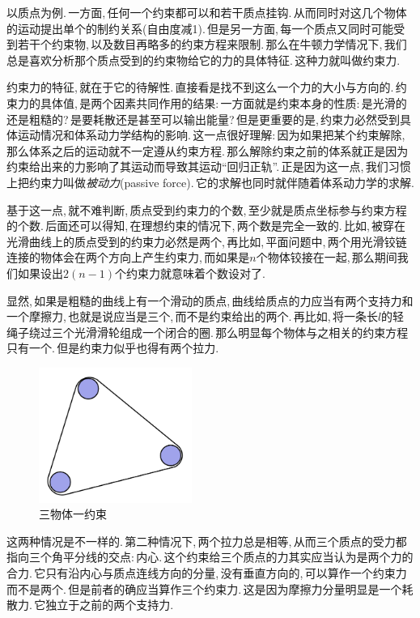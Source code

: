 以质点为例.\,一方面,\,任何一个约束都可以和若干质点挂钩.\,从而同时对这几个物体的运动提出单个的制约关系(自由度减1).\,但是另一方面,\,每一个质点又同时可能受到若干个约束物,\,以及数目再略多的约束方程来限制.\,那么在牛顿力学情况下,\,我们总是喜欢分析那个质点受到的约束物给它的力的具体特征.\,这种力就叫做约束力.

约束力的特征,\,就在于它的待解性.\,直接看是找不到这么一个力的大小与方向的.\,约束力的具体值,\,是两个因素共同作用的结果:\,一方面就是约束本身的性质:\,是光滑的还是粗糙的?\,是要耗散还是甚至可以输出能量?\,但是更重要的是,\,约束力必然受到具体运动情况和体系动力学结构的影响.\,这一点很好理解:\,因为如果把某个约束解除,\,那么体系之后的运动就不一定遵从约束方程.\,那么解除约束之前的体系就正是因为约束给出来的力影响了其运动而导致其运动``回归正轨''.\,正是因为这一点,\,我们习惯上把约束力叫做\emph{被动力}(passive force).\,它的求解也同时就伴随着体系动力学的求解.

基于这一点,\,就不难判断,\,质点受到约束力的个数,\,至少就是质点坐标参与约束方程的个数.\,后面还可以得知,\,在理想约束的情况下,\,两个数是完全一致的.\,比如,\,被穿在光滑曲线上的质点受到的约束力必然是两个,\,再比如,\,平面问题中,\,两个用光滑铰链连接的物体会在两个方向上产生约束力,\,而如果是$n$个物体铰接在一起,\,那么期间我们如果设出$2(n-1)$个约束力就意味着个数设对了.


显然,\,如果是粗糙的曲线上有一个滑动的质点,\,曲线给质点的力应当有两个支持力和一个摩擦力,\,也就是说应当是三个,\,而不是约束给出的两个.\,再比如,\,将一条长$l$的轻绳子绕过三个光滑滑轮组成一个闭合的圈.\,那么明显每个物体与之相关的约束方程只有一个.\,但是约束力似乎也得有两个拉力.

\begin{figure}
\centering
\includegraphics[width=5cm]{image/6-2-4.png}
\caption{三物体一约束}
\end{figure}
这两种情况是不一样的.\,第二种情况下,\,两个拉力总是相等,\,从而三个质点的受力都指向三个角平分线的交点:\,内心.\,这个约束给三个质点的力其实应当认为是两个力的合力.\,它只有沿内心与质点连线方向的分量,\,没有垂直方向的,\,可以算作一个约束力而不是两个.\,但是前者的确应当算作三个约束力.\,这是因为摩擦力分量明显是一个耗散力.\,它独立于之前的两个支持力.

